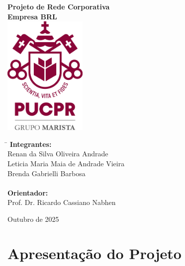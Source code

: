 \documentclass[a4paper, 12pt]{article}
\begin{document}
\begin{titlepage}
    \begin{center}
        \vspace*{1cm}
        {\Large{\textbf{Projeto de Rede Corporativa}}}\\
        \vspace{0.8cm}
        {\large{\textbf{Empresa BRL}}}\\
        \vspace{1.2cm}
        \includegraphics[width=0.3\textwidth]{pucpr.png}
        \vspace{1.2cm}

        \begin{flushleft}
            \begin{tabbing}
                \hspace{3cm} \= \kill
                \textbf{Integrantes:} \\
                \> Renan da Silva Oliveira Andrade \\
                \> Leticia Maria Maia de Andrade Vieira \\
                \> Brenda Gabrielli Barbosa \\
                \\
                \textbf{Orientador:} \\
                \> Prof. Dr. Ricardo Cassiano Nabhen \\
            \end{tabbing}
        \end{flushleft}
        \vspace{\fill}
        \large{Outubro de 2025}
    \end{center}
\end{titlepage}

\tableofcontents
\thispagestyle{empty}
\newpage


\section{Apresentação do Projeto}
\label{sec:apresentacao}
\end{document}
